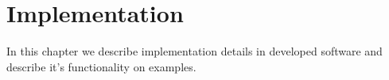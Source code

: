 \chapter{Implementation}

In this chapter we describe implementation details in developed software and describe it's functionality on examples.


